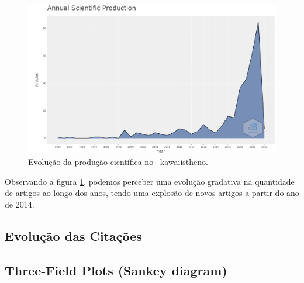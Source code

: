 \begin{figure}
    \centering
    \includegraphics[width=1\textwidth]{experiments/KawaiiStheno/PesqBibliogr/NeurocienciaIIA/WoS-20220206/scientificProdution.png}
    \caption{Evolução da produção científica no \dataset\   kawaiistheno.}
    \label{fig:evol:anual:kawaiistheno}
\end{figure}

Observando a figura \ref{fig:evol:anual:kawaiistheno}, podemos perceber uma evolução gradativa na quantidade de artigos ao longo dos anos, tendo uma explosão de novos artigos a partir do ano de 2014.

\subsection{Evolução das Citações}

\subsection{Three-Field Plots (Sankey diagram)}